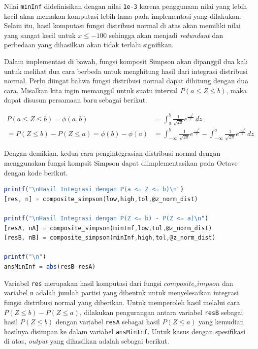 \documentclass[journal,12pt,onecolumn,a4paper]{IEEEtran}
\begin{document}
Nilai \lstinline{minInf} didefinisikan dengan nilai \lstinline{1e-3} karena penggunaan nilai yang lebih kecil akan memakan komputasi lebih lama pada implementasi yang dilakukan. Selain itu, hasil komputasi fungsi distribusi normal di atas akan memiliki nilai yang sangat kecil untuk \(x \le -100\) sehingga akan menjadi \emph{redundant} dan perbedaan yang dihasilkan akan tidak terlalu signifikan.

Dalam implementasi di bawah, fungsi komposit Simpson akan dipanggil dua kali untuk melihat dua cara berbeda untuk menghitung hasil dari integrasi distribusi normal. Perlu diingat bahwa fungsi distribusi normal dapat dihitung dengan dua cara. Misalkan kita ingin memanggil untuk suatu interval \(P(a \le Z \le b)\), maka dapat disusun persamaan baru sebagai berikut.

\begin{equation*}
	\begin{split}
		P(a \le Z \le b )  = \phi(a,b) & = \int_{a}^{b} \frac{1}{\sqrt{2\pi}}e ^{\frac{-z^2}{2}} \,dz \\
		=  P(Z \le b ) - P(Z \le a )  = \phi(b)-\phi(a) & =  \int_{-\infty}^{b} \frac{1}{\sqrt{2\pi}}e ^{\frac{-z^2}{2}} - \int_{-\infty}^{a} \frac{1}{\sqrt{2\pi}}e ^{\frac{-z^2}{2}} \,dz
	\end{split}
\end{equation*}

Dengan demikian, kedua cara pengintegrasian distribusi normal dengan menggunakan fungsi kompsit Simpson dapat diimplementasikan pada Octave dengan kode berikut.

\begin{center}
	\begin{lstlisting}[language=Octave]
printf("\nHasil Integrasi dengan P(a <= Z <= b)\n")
[res, n] = composite_simpson(low,high,tol,@z_norm_dist)
		
printf("\nHasil Integrasi dengan P(Z <= b) - P(Z <= a)\n")
[resA, nA] = composite_simpson(minInf,low,tol,@z_norm_dist)
[resB, nB] = composite_simpson(minInf,high,tol,@z_norm_dist)
		
printf("\n")
ansMinInf = abs(resB-resA)
	\end{lstlisting}
\end{center}

Variabel \lstinline{res} merupakan hasil komputasi dari fungsi \(composite_simpson\) dan variabel \lstinline{n} adalah jumlah partisi yang dibentuk untuk menyelesaikan integrasi fungsi distribusi normal yang diberikan. Untuk memperoleh hasil melalui cara \(P(Z \le b ) - P(Z \le a )\), dilakukan pengurangan antara variabel \lstinline{resB} sebagai hasil \(P(Z \le b )\) dengan variabel \lstinline{resA} sebagai hasil \(P(Z \le a )\) yang kemudian hasilnya disimpan ke dalam variabel \lstinline{ansMinInf}. Untuk kasus dengan spesifikasi di atas, \emph{output} yang dihasilkan adalah sebagai berikut.
\end{document}
